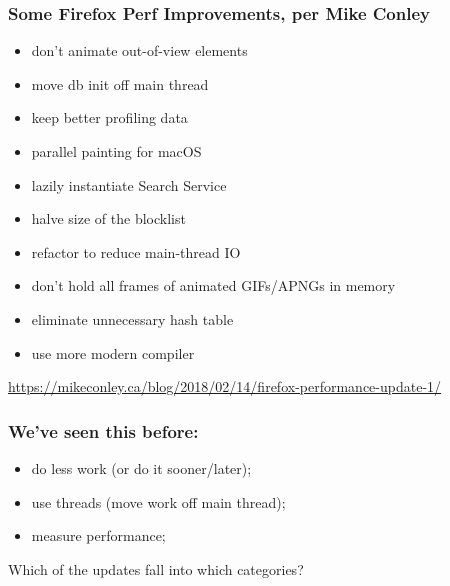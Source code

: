 \begin{frame}[fragile]
\frametitle{Some Firefox Perf Improvements, per Mike Conley}

\begin{minipage}{.5\textwidth}
\begin{itemize}
\item don't animate out-of-view elements
\item move db init off main thread
\item keep better profiling data
\item parallel painting for macOS
\item lazily instantiate Search Service
\end{itemize}
\end{minipage}\begin{minipage}{.5\textwidth}
\begin{itemize}
\item halve size of the blocklist
\item refactor to reduce main-thread IO
\item don't hold all frames of animated GIFs/APNGs in memory
\item eliminate unnecessary hash table
\item use more modern compiler
\end{itemize}
\end{minipage}

\begin{center}
\url{https://mikeconley.ca/blog/2018/02/14/firefox-performance-update-1/}
\end{center}

\end{frame}

\begin{frame}
\large
\frametitle{We've seen this before:}
\begin{itemize}
\item do less work (or do it sooner/later);
\item use threads (move work off main thread);
\item measure performance;
\end{itemize}
Which of the updates fall into which categories?
\end{frame}

